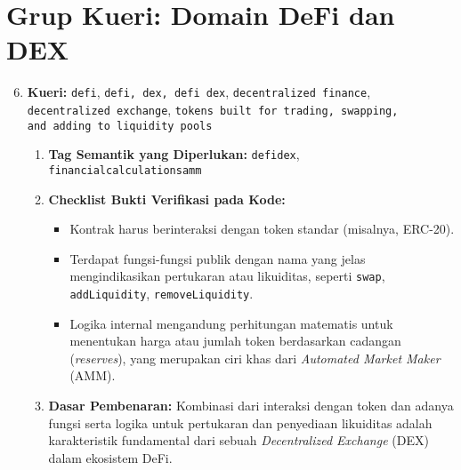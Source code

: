 \section{Grup Kueri: Domain DeFi dan DEX}
\begin{enumerate}
	\setcounter{enumi}{5}
	\item \textbf{Kueri:} \texttt{defi}, \texttt{defi, dex, defi dex}, \texttt{decentralized finance}, \\\texttt{decentralized exchange}, \texttt{tokens built for trading, swapping, \\and adding to liquidity pools}
	      \begin{enumerate}
		      \item \textbf{Tag Semantik yang Diperlukan:} \texttt{defi\textunderscore dex}, \\\texttt{financial\textunderscore calculations\textunderscore amm}
		      \item \textbf{Checklist Bukti Verifikasi pada Kode:}
		            \begin{itemize}
			            \item Kontrak harus berinteraksi dengan token standar (misalnya, ERC-20).
			            \item Terdapat fungsi-fungsi publik dengan nama yang jelas mengindikasikan pertukaran atau likuiditas, seperti \texttt{swap}, \texttt{addLiquidity}, \texttt{removeLiquidity}.
			            \item Logika internal mengandung perhitungan matematis untuk menentukan harga atau jumlah token berdasarkan cadangan (\textit{reserves}), yang merupakan ciri khas dari \textit{Automated Market Maker} (AMM).
		            \end{itemize}
		      \item \textbf{Dasar Pembenaran:} Kombinasi dari interaksi dengan token dan adanya fungsi serta logika untuk pertukaran dan penyediaan likuiditas adalah karakteristik fundamental dari sebuah \textit{Decentralized Exchange} (DEX) dalam ekosistem DeFi.
	      \end{enumerate}
\end{enumerate}

